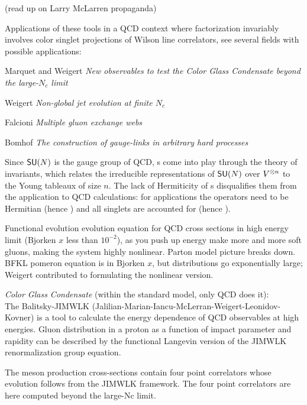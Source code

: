 

(read up on Larry McLarren propaganda)

Applications of these
tools in a QCD context where factorization invariably involves color
singlet projections of Wilson line correlators, see
several fields with possible
applications:

Marquet and Weigert {\em New observables to test the {Color
Glass Condensate} beyond the large-{$N_c$} limit}

Weigert
{\em Non-global jet evolution at finite {$N_c$}}

Falcioni \etal{}
{\em Multiple gluon exchange webs}

Bomhof \etal{}
{\em The construction of gauge-links in arbitrary hard processes}

Since $\mathsf{SU}(N)$ is the gauge group of QCD, \Ypo s come into play through the
theory of invariants, which relates the irreducible representations of $\mathsf{SU}(N)$
over $V^{\otimes n}$ to the Young tableaux of size $n$.
The lack of Hermiticity of \Ypo s  disqualifies them from the application to
QCD calculations: for applications the operators need to be Hermitian (hence
) and all singlets are accounted for (hence
).

Functional evolution evolution equation  for QCD cross sections in high
energy limit (Bjorken $x$ less than $10^{-2}$), as you push up energy make
more and more soft gluons, making the system highly nonlinear. Parton model
picture breaks down. BFKL pomeron equation is in Bjorken $x$, but distributions go
exponentially large; Weigert contributed to formulating the nonlinear
version.

{\em Color Glass Condensate} (within the standard model, only QCD does it):
\\

The Balitsky-\-JIMWLK (Jalilian-\-Marian-\-Iancu-\-McLerran-\-Weigert-\-Leonidov-\-Kovner)
is a tool to calculate the energy dependence of QCD observables at high
energies. Gluon  distribution  in  a  proton  as  a  function  of impact
parameter and rapidity can be described by the functional Langevin version of
the JIMWLK renormalization group equation.

The meson production cross-sections contain four point correlators
whose evolution follows from the JIMWLK framework. The four point correlators
are here computed beyond the large-Nc limit.


